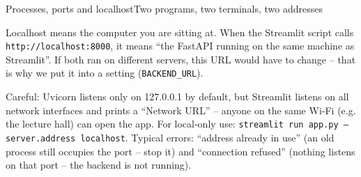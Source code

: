 \documentclass[aspectratio=169,11pt]{beamer}
\begin{document}
\begin{frame}[fragile]{Processes, ports and localhost}{Two programs, two terminals, two addresses}
{  Localhost means the computer you are sitting at. When the Streamlit script calls \texttt{http://localhost:8000}, it means ``the FastAPI running on the same machine as Streamlit''. If both ran on different servers, this URL would have to change -- that is why we put it into a setting (\texttt{BACKEND\_URL}).\par
  Careful: Uvicorn listens only on 127.0.0.1 by default, but Streamlit listens on all network interfaces and prints a ``Network URL'' -- anyone on the same Wi-Fi (e.g. the lecture hall) can open the app. For local-only use: \texttt{streamlit run app.py --server.address localhost}. Typical errors: ``address already in use'' (an old process still occupies the port -- stop it) and ``connection refused'' (nothing listens on that port -- the backend is not running).}
\end{frame}
\end{document}
